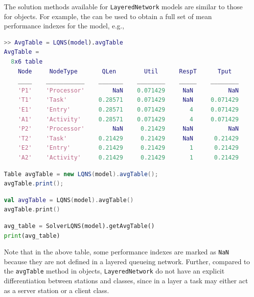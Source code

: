 The solution methods available for \texttt{LayeredNetwork} models are similar to those for  objects. For example, the  can be used to obtain a full set of mean performance indexes for the model, e.g.,
\begin{MATLAB}
\begin{lstlisting}[language = matlab]
>> AvgTable = LQNS(model).avgTable
AvgTable =
  8x6 table
    Node     NodeType       QLen        Util      RespT      Tput
    ____    ___________    _______    ________    _____    ________
    'P1'    'Processor'        NaN    0.071429     NaN          NaN
    'T1'    'Task'         0.28571    0.071429     NaN     0.071429
    'E1'    'Entry'        0.28571    0.071429       4     0.071429
    'A1'    'Activity'     0.28571    0.071429       4     0.071429
    'P2'    'Processor'        NaN     0.21429     NaN          NaN
    'T2'    'Task'         0.21429     0.21429     NaN      0.21429
    'E2'    'Entry'        0.21429     0.21429       1      0.21429
    'A2'    'Activity'     0.21429     0.21429       1      0.21429
\end{lstlisting}
\end{MATLAB}
\begin{JAVA}
\begin{lstlisting}[language=java, basicstyle=\ttfamily\scriptsize]
Table avgTable = new LQNS(model).avgTable();
avgTable.print();
\end{lstlisting}
\end{JAVA}
\begin{KOTLIN}
\begin{lstlisting}[language=kotlin, basicstyle=\ttfamily\scriptsize]
val avgTable = LQNS(model).avgTable()
avgTable.print()
\end{lstlisting}
\end{KOTLIN}
\begin{PYTHON}
\begin{lstlisting}[language=python]
avg_table = SolverLQNS(model).getAvgTable()
print(avg_table)
\end{lstlisting}
\end{PYTHON}
Note that in the above table, some performance indexes are marked as \texttt{NaN} because they are not defined in a layered queueing network. Further, compared to the \texttt{avgTable} method in  objects, \texttt{LayeredNetwork} do not have an explicit differentiation between stations and classes, since in a layer a task may either act as a server station or a client class.

